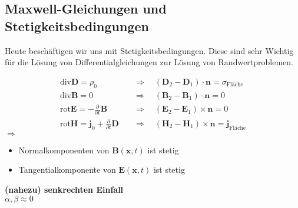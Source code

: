 \documentclass[titlepage,11pt,a4paper,ngerman]{report}
\newcommand{\tx}[1]{\textrm{#1}}
\newcommand{\prt}[2]{\frac{\partial #1}{\partial #2}}
\renewcommand{\vec}[1]{\boldsymbol{#1}}
\newcommand{\lcom}[1]{\color{MidnightBlue}#1\color{black}}
\begin{document}

\subsection{Maxwell-Gleichungen und Stetigkeitsbedingungen} %

\lcom{Heute beschäftigen wir uns mit Stetigkeitsbedingungen. Diese sind sehr Wichtig für die Lösung von Differentialgleichungen zur Lösung von Randwertproblemen.}

\begin{align*}
\tx{div} \vec{D} = \rho_0 \quad &\Rightarrow \quad \left(\vec{D}_2 - \vec{D}_1\right) \cdot \vec{n} = \sigma_{\tx{Fläche}}\\[5pt]
\tx{div} \vec{B} = 0 \quad &\Rightarrow \quad \left(\vec{B}_2 - \vec{B}_1\right) \cdot \vec{n} = 0\\
\tx{rot} \vec{E} = - \prt{}{t} \vec{B} \quad &\Rightarrow \quad \left(\vec{E}_2 - \vec{E}_1\right) \times \vec{n} = 0\\
\tx{rot} \vec{H} = \vec{j}_0 + \prt{}{t} \vec{D} \quad &\Rightarrow \quad \left(\vec{H}_2 - \vec{H}_1\right) \times \vec{n} = \vec{j}_{\tx{Fläche}}
\end{align*}
$ \Rightarrow $
\begin{itemize}
	\item Normalkomponenten von $ \vec{B}(\vec{x},t) $ ist stetig
	\item Tangentialkomponente von $ \vec{E}(\vec{x},t) $ ist stetig
\end{itemize}
\textbf{(nahezu) senkrechten Einfall}\\
$ \alpha,\beta \approx 0 $\\
\end{document}
